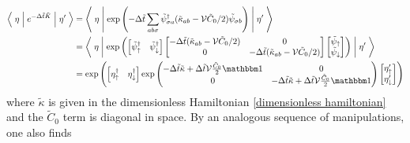 \begin{align}
		\matrixElement{\eta}{ e^{-\Delta \tilde{t} \tilde{K}} }{\eta'}
	&= 
		\matrixElement{\eta}{ \exp\left(-\Delta \tilde{t} \sum_{ab \sigma} \tilde{\psi}^{\dagger}_{\sigma a} (\tilde{\kappa}_{ab} - \Volume \tilde{C}_0 / 2) \tilde{\psi}_{\sigma b} \right)}{\eta'}
	\nonumber\\
	&=
		\matrixElement{\eta}{ \exp\left(
			\begin{bmatrix} \tilde{\psi}^{\dagger}_{\up} &  \tilde{\psi}^{\dagger}_{\down}  \end{bmatrix} 
			\begin{bmatrix}
				-\Delta \tilde{t} (\tilde{\kappa}_{ab} - \Volume \tilde{C}_0 / 2)	& 0 \\
				0 									& -\Delta \tilde{t} (\tilde{\kappa}_{ab} - \Volume \tilde{C}_0 / 2) 
			\end{bmatrix} 
			\begin{bmatrix} \tilde{\psi}_{\up} \\  \tilde{\psi}_{\down}  \end{bmatrix}
		\right) }{\eta'}
	\nonumber\\
	& = 
		\exp\left( 
			\begin{bmatrix} {\eta}^{\dagger}_{\up} &  {\eta}^{\dagger}_{\down}  \end{bmatrix} 
			\exp\begin{pmatrix}
				-\Delta \tilde{t} \tilde{\kappa} + \Delta\tilde{t} \Volume \frac{\tilde{C}_0}{2} \one & 0 \\
				0 									& -\Delta \tilde{t} \tilde{\kappa} + \Delta\tilde{t} \Volume \frac{\tilde{C}_0}{2} \one
			\end{pmatrix} 
			\begin{bmatrix} {\eta}_{\up}' \\  {\eta}_{\down}'  \end{bmatrix}
		\right)
\end{align}
where $\tilde{\kappa}$ is given in the dimensionless Hamiltonian \eqref{dimensionless hamiltonian} and the $\tilde{C}_0$ term is diagonal in space.
By an analogous sequence of manipulations, one also finds
